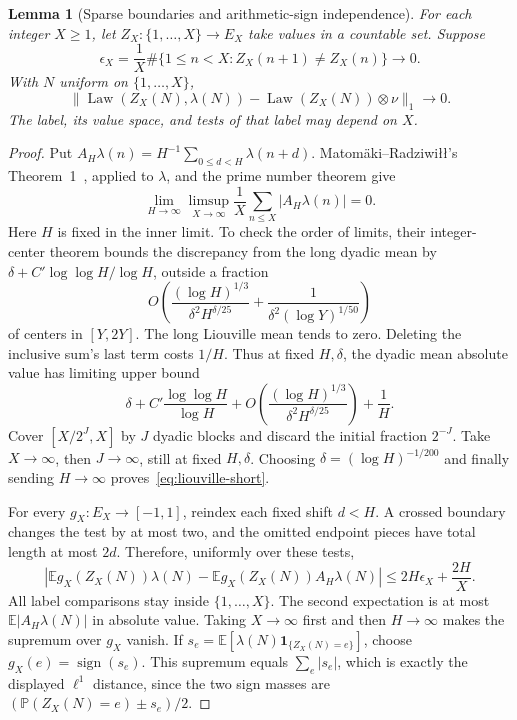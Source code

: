 \documentclass[11pt]{amsart}
\newtheorem{lemma}[theorem]{Lemma}
\theoremstyle{definition}
\theoremstyle{remark}
\newcommand{\E}{\mathbb E}
\newcommand{\PP}{\mathbb P}
\newcommand{\one}{\mathbf 1}
\begin{document}
\begin{lemma}[Sparse boundaries and arithmetic-sign independence]\label{lem:sparse-sign}
For each integer $X\ge1$, let $Z_X:\{1,\ldots,X\}\to E_X$ take values in a countable set. Suppose
\[
 \epsilon_X=\frac1X\#\{1\le n<X:Z_X(n+1)\ne Z_X(n)\}\longrightarrow0.
\]
With $N$ uniform on $\{1,\ldots,X\}$,
\[
 \bigl\|\operatorname{Law}(Z_X(N),\lambda(N))-
 \operatorname{Law}(Z_X(N))\otimes\nu\bigr\|_1\longrightarrow0.
\]
The label, its value space, and tests of that label may depend on $X$.
\end{lemma}
\begin{proof}
Put $A_H\lambda(n)=H^{-1}\sum_{0\le d<H}\lambda(n+d)$. Matom\"aki--Radziwi\l\l's Theorem~1~\cite{MatomakiRadziwill2016}, applied to $\lambda$, and the prime number theorem give
\begin{equation}\label{eq:liouville-short}
 \lim_{H\to\infty}\limsup_{X\to\infty}
 \frac1X\sum_{n\le X}|A_H\lambda(n)|=0.
\end{equation}
Here $H$ is fixed in the inner limit. To check the order of limits, their integer-center theorem bounds the discrepancy from the long dyadic mean by $\delta+C'\log\log H/\log H$, outside a fraction
\[
 O\!\left(\frac{(\log H)^{1/3}}{\delta^2H^{\delta/25}}+
 \frac1{\delta^2(\log Y)^{1/50}}\right)
\]
of centers in $[Y,2Y]$. The long Liouville mean tends to zero. Deleting the inclusive sum's last term costs $1/H$. Thus at fixed $H,\delta$, the dyadic mean absolute value has limiting upper bound
\[
 \delta+C'\frac{\log\log H}{\log H}
 +O\!\left(\frac{(\log H)^{1/3}}{\delta^2H^{\delta/25}}\right)+\frac1H.
\]
Cover $[X/2^J,X]$ by $J$ dyadic blocks and discard the initial fraction $2^{-J}$. Take $X\to\infty$, then $J\to\infty$, still at fixed $H,\delta$. Choosing $\delta=(\log H)^{-1/200}$ and finally sending $H\to\infty$ proves~\eqref{eq:liouville-short}.

For every $g_X:E_X\to[-1,1]$, reindex each fixed shift $d<H$. A crossed boundary changes the test by at most two, and the omitted endpoint pieces have total length at most $2d$. Therefore, uniformly over these tests,
\[
 \left|\E g_X(Z_X(N))\lambda(N)
       -\E g_X(Z_X(N))A_H\lambda(N)\right|
 \le2H\epsilon_X+\frac{2H}{X}.
\]
All label comparisons stay inside $\{1,\ldots,X\}$. The second expectation is at most $\E|A_H\lambda(N)|$ in absolute value. Taking $X\to\infty$ first and then $H\to\infty$ makes the supremum over $g_X$ vanish. If $s_e=\E[\lambda(N)\one_{\{Z_X(N)=e\}}]$, choose $g_X(e)=\operatorname{sign}(s_e)$. This supremum equals $\sum_e|s_e|$, which is exactly the displayed $\ell^1$ distance, since the two sign masses are $(\PP(Z_X(N)=e)\pm s_e)/2$.
\end{proof}
\end{document}
